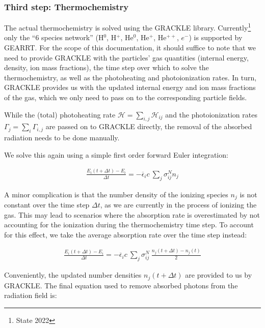 \subsubsection{Third step: Thermochemistry}

The actual thermochemistry is solved using the GRACKLE \citep{smithGrackleChemistryCooling2017a} 
library. Currently\footnote{State 2022} only the ``6 species network'' (H$^0$, H$^+$, He$^0$, 
He$^+$, He$^{++}$, $e^{-}$)
is supported by GEARRT. For the scope of this documentation, it should suffice to note that we need 
to provide GRACKLE with the particles' gas quantities (internal energy, density, ion mass 
fractions), the time step over which to solve the thermochemistry, as well as the photoheating and 
photoionization rates. In turn, GRACKLE provides us with the updated internal energy and ion mass 
fractions of the gas, which we only need to pass on to the corresponding particle fields.


While the (total) photoheating rate $\mathcal{H} = \sum_{i,j} \mathcal{H}_{ij}$ and the 
photoionization rates $\Gamma_{j} = \sum_i \Gamma_{i,j}$ are passed on to GRACKLE directly, the 
removal of the absorbed radiation needs to be done manually.

We solve this again using a simple first order forward Euler integration:

\begin{align}
    \frac{E_i (t + \Delta t) - E_i}{\Delta t} = -\overline{\epsilon}_i c \ \sum_j \sigma_{i j} ^ 
N n_j
\end{align}

A minor complication is that the number density of the ionizing species $n_j$ is not constant over 
the time step $\Delta t$, as we are currently in the process of ionizing the gas. This may lead to 
scenarios where the absorption rate is overestimated by not accounting for the ionization during 
the thermochemistry time step. To account for this effect, we take the average absorption rate over 
the time step instead:


\begin{align}
    \frac{E_i (t + \Delta t) - E_i}{\Delta t} 
        = -\overline{\epsilon}_i c \ \sum_j \sigma_{i j} ^ N  \
    \frac{n_j(t + \Delta t) - n_j(t)}{2}
\end{align}

Conveniently, the updated number densities $n_j(t + \Delta t)$ are provided to us by GRACKLE. The 
final equation used to remove absorbed photons from the radiation field is:



